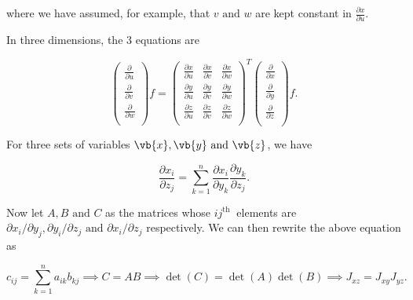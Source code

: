 \documentclass[english,a4paper,12pt]{report}
\begin{document}
where we have assumed, for example, that \(v \text { and } w\) are kept constant in \(\frac{\partial x}{\partial u} \).  

In three dimensions, the 3 equations are

\begin{equation} \label{jacobderi} 
	\begin{pmatrix}
		 \frac{\partial }{\partial u }  \\
		 \frac{\partial }{\partial v }  \\
		 \frac{\partial }{\partial w }  \\
	\end{pmatrix} f = \begin{pmatrix}
		\frac{\partial x}{\partial u}  & \frac{\partial x}{\partial v}  & \frac{\partial x}{\partial w}   \\
		\frac{\partial y}{\partial u}  & \frac{\partial y}{\partial v}  & \frac{\partial y}{\partial w}   \\
		\frac{\partial z}{\partial u}  & \frac{\partial z}{\partial v}  & \frac{\partial z}{\partial w}   \\
	\end{pmatrix}^T \begin{pmatrix}
		\frac{\partial }{\partial x }  \\
		\frac{\partial }{\partial y }  \\
		\frac{\partial }{\partial z }  \\
   \end{pmatrix} f.
\end{equation} 

For three sets of variables \(\vb{x} ,\vb{y} \text { and } \vb{z} \), we have

\begin{equation}
	\frac{\partial x_{i} }{\partial z_{j} } = \sum_{k=1}^{n} \frac{\partial x_{i} }{\partial y_{k} } \frac{\partial y_{k} }{\partial z_{j} }.   
\end{equation}

Now let \(A, B \text { and } C\) as the matrices whose \(ij^{\text{th }} \) elements are \(\partial x_{i} / \partial y_{j} , \partial y_{i} / \partial z_{j}  \text { and } \partial x_{i}/ \partial z_{j} \) respectively. We can then rewrite the above equation as 

\begin{equation}
	c_{ij} = \sum_{k=1}^{n} a_{ik}b_{kj} \implies C = AB \implies \det (C) = \det (A) \det (B) \implies J_{xz} = J_{xy} J_{yz}.   
\end{equation}
\end{document}

